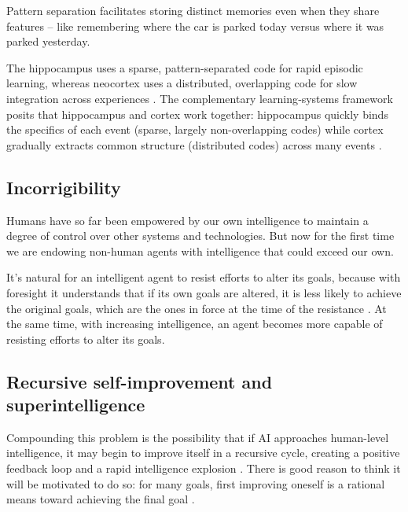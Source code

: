 Pattern separation facilitates storing distinct memories even when they share features -- like remembering where the car is parked today versus where it was parked yesterday. 

The hippocampus uses a sparse, pattern-separated code for rapid episodic learning, whereas neocortex uses a distributed, overlapping code for slow integration across experiences \citep{kumaran2016learning}. The complementary learning‐systems framework posits that hippocampus and cortex work together: hippocampus quickly binds the specifics of each event (sparse, largely non-overlapping codes) while cortex gradually extracts common structure (distributed codes) across many events \citep{OReilly2014}. 



\subsection{Incorrigibility}

Humans have so far been empowered by our own intelligence to maintain a degree of control over other systems and technologies. But now for the first time we are endowing non-human agents with intelligence that could exceed our own.  

It's natural for an intelligent agent to resist efforts to alter its goals, because with foresight it understands that if its own goals are altered, it is less likely to achieve the original goals, which are the ones in force at the time of the resistance \citep{bostrom2014superintelligence,russell2019human, macaskill2022we, lamerton2025lockin}. At the same time, with increasing intelligence, an agent becomes more capable of resisting efforts to alter its goals. 

\subsection{Recursive self-improvement and superintelligence}

Compounding this problem is the possibility that if AI approaches human-level intelligence, it may begin to improve itself in a recursive cycle, creating a positive feedback loop and a rapid intelligence explosion \citep{good1965speculations, vinge1993coming}. There is good reason to think it will be motivated to do so: for many goals, first improving oneself is a rational means toward achieving the final goal \citep{silver2021reward, bostrom2012superintelligent, omohundro2018basic, turner2019optimal}. 

